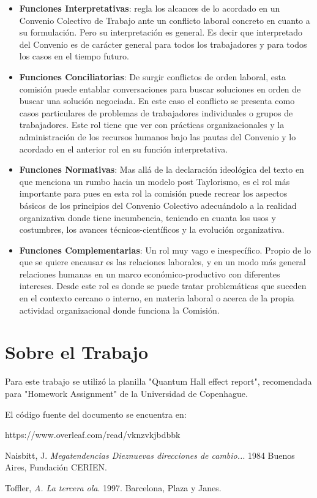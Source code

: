 \documentclass[a4paper, 12pt]{article}
\begin{document}
\begin{itemize}
\item \textbf{Funciones Interpretativas}: regla los alcances de lo acordado en un Convenio Colectivo de Trabajo ante un conflicto laboral concreto en cuanto a su formulación. Pero su interpretación es general. Es decir que interpretado del Convenio es de carácter general para todos los trabajadores y para todos los casos en el tiempo futuro.

\item \textbf{Funciones Conciliatorias}: De surgir conflictos de orden laboral, esta comisión puede entablar conversaciones para buscar soluciones en orden de buscar una solución negociada. En este caso el conflicto se presenta como casos particulares de problemas de trabajadores individuales o grupos de trabajadores. Este rol tiene que ver con prácticas organizacionales y la administración de los recursos humanos bajo las pautas del Convenio y lo acordado en el anterior rol en su función interpretativa. 

\item \textbf{Funciones Normativas}: Mas allá de la declaración ideológica del texto en que menciona un rumbo hacia un modelo post Taylorismo, es el rol más importante para pues en esta rol la comisión puede recrear los aspectos básicos de los principios del Convenio Colectivo adecuándolo a la realidad organizativa donde tiene incumbencia, teniendo en cuanta los usos y costumbres, los avances técnicos-científicos y la evolución organizativa.

\item \textbf{Funciones Complementarias}: Un rol muy vago e inespecífico. Propio de lo que se quiere encausar es las relaciones laborales, y en un modo más general relaciones humanas en un marco económico-productivo con diferentes intereses. Desde este rol es donde se puede tratar problemáticas que suceden en el contexto cercano o interno, en materia laboral o acerca de la propia actividad organizacional donde funciona la Comisión. 

\end{itemize}



\section{Sobre el Trabajo}
Para este trabajo se utilizó la planilla "Quantum Hall effect report", recomendada para "Homework Assignment" de la Universidad de Copenhague.

El código fuente del documento se encuentra en:

https://www.overleaf.com/read/vknzvkjbdbbk

\begin{thebibliography}{9}
Naisbitt, J. \emph{Megatendencias Dieznuevas direcciones de cambio..}. 1984 Buenos Aires, Fundación CERIEN.

Toffler, \emph{A. La tercera ola}. 1997. Barcelona, Plaza y Janes. 
\end{thebibliography}
\end{document}
